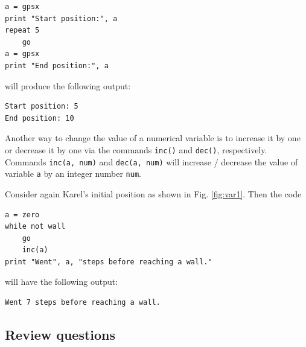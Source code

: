 {{{{\begin{verbatim}
a = gpsx
print "Start position:", a
repeat 5
    go
a = gpsx 
print "End position:", a
\end{verbatim}
will produce the following output:

\begin{verbatim}
Start position: 5
End position: 10
\end{verbatim}
Another way to change the value of a numerical variable is to increase it by one or 
decrease it by one via the commands {\tt inc()} and 
{\tt dec()}, respectively. Commands {\tt inc(a, num)} and 
{\tt dec(a, num)} will increase / decrease the value of variable {\tt a}
by an integer number {\tt num}.

Consider again Karel's initial position as shown 
in Fig. \ref{fig:var1}. Then the code

\begin{verbatim}
a = zero
while not wall
    go
    inc(a)
print "Went", a, "steps before reaching a wall."
\end{verbatim}
will have the following output:

\begin{verbatim}
Went 7 steps before reaching a wall.
\end{verbatim}

\subsection{Review questions}

}}}}
